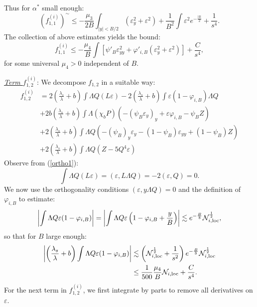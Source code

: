\documentclass[11pt,a4paper,reqno]{amsart}
\theoremstyle{remark}
\numberwithin{equation}{section}
\def\fref#1{{\rm (\ref{#1})}}
\def\e{\varepsilon}
\def\fref#1{{\rm (\ref{#1})}}
\begin{document}
Thus for $\alpha^*$ small enough:
$$(f^{(i)}_{1,1})^\sim   \leq  - \frac { \mu_{3}}   {2 B} \int_{|y|<B/2}  \left(  \varepsilon_y^2 + \varepsilon^2 \right) + \frac 1 {B^2} \int \e^2 e^{-\frac{|y|}{2}}+\frac 1{s^4}.$$ 
The collection of above estimates yields the bound:
\begin{equation}\label{eq:cf11}
   f^{(i)}_{1,1}  \leq  - \frac  {\mu_4} B    \int\left[\psi'_B\e_{yy}^2+\varphi'_{i,B}(\e_y^2+\e^2)\right] + \frac C{s^4},
    \end{equation}
    for some universal $\mu_4>0$ independent of $B$.
    
    \medskip
    
   
   
  \underline{{\em Term $f^{(i)}_{1,2}$}}:  We decompose  $f_{1,2}$ in a suitable way:
\begin{align*}
f^{(i)}_{1,2} & =  2 \left(\frac {{\lambda}_{s}}{{\lambda}}+{b}\right)  \int {\Lambda} Q  (L \varepsilon) -2\left(\frac {{\lambda}_{s}}{{\lambda}}+{b}\right)\int\varepsilon (1-\varphi_{i,B})\Lambda Q
\\
&+ 2b \left(\frac {{\lambda}_{s}}{{\lambda}}+{b}\right)  \int {\Lambda} ( \chi_b P)  \left(-(\psi_B\e_y)_{y}  + \e\varphi_{i,B} - \psi_B Z\right)\\
& + 2 \left(\frac {{\lambda}_{s}}{{\lambda}}+{b}\right)  \int {\Lambda} Q      \left(-(\psi_B)_y\e_y
-(1-\psi_B)\e_{yy}+(1-\psi_B)Z\right) \\&
+ 2\left(\frac {{\lambda}_{s}}{{\lambda}}+{b}\right)  \int {\Lambda} Q  (Z-5Q^4\e)
\end{align*}
Observe from \fref{ortho1}: $$\int \Lambda Q (L\e)=(\e,L\Lambda Q)=-2(\e,Q)=0.$$  We now use the orthogonality conditions $( \varepsilon, y {\Lambda} Q)=0$ and the definition of $\varphi_{i,B}$ to estimate:
$$
	\left| \int {\Lambda} Q \varepsilon (1-\varphi_{i,B}) \right| = \left| \int {\Lambda} Q \varepsilon \left(1-\varphi_{i,B}+ \frac yB\right)\right|
	\lesssim e^{- \frac B 8 } \mathcal{N}_{i,\rm loc}^{\frac 12}  ,
$$
so that  for $B$ large enough:
\begin{align*}
  \left|  \left(\frac {{\lambda}_{s}}{{\lambda}}+{b}\right)  \int {\Lambda} Q\varepsilon (1-\varphi_{i,B}) \right| 
&\lesssim \left( \mathcal{N}_{i,\rm loc}^{\frac 12}  +\frac 1{s^2} \right) e^{- \frac B 8}  \mathcal{N}_{i,\rm loc}^{\frac 12}  
\\ &
\leq 
 \frac 1 {500}  \frac {\mu_4} {B} \mathcal{N}_{i,\rm loc} 
+\frac C{s^4}.
\end{align*}
For the next term in $f_{1,2}^{(i)}$, we first integrate by parts to remove all derivatives on $\e$.
\end{document}
